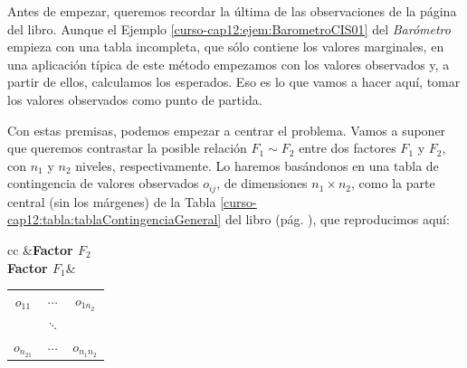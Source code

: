 \documentclass[10pt,a4paper]{article}\usepackage[]{graphicx}\usepackage[]{color}
\newcounter {cont01}
\begin{document}
Antes de empezar, queremos recordar la última de las observaciones de la página \pageref{curso-cap12:lugar:observacionesEjemploBarometro} del libro. Aunque el Ejemplo \ref{curso-cap12:ejem:BarometroCIS01} del {\em Barómetro} empieza con una tabla incompleta, que sólo contiene los valores marginales, en una aplicación típica de este método empezamos con los valores observados y, a partir de ellos, calculamos los esperados.  Eso es lo que vamos a hacer aquí, tomar los valores observados como punto de partida.


Con estas premisas, podemos empezar a centrar el problema. Vamos a suponer que queremos contrastar la posible relación $F_1 \sim F_2$ entre dos factores $F_1$ y $F_2$, con $n_1$ y $n_2$ niveles, respectivamente. Lo haremos basándonos en una tabla de contingencia de valores observados $o_{ij}$, de dimensiones $n_1\times n_2$, como la parte central (sin los márgenes) de la Tabla \ref{curso-cap12:tabla:tablaContingenciaGeneral} del libro (pág. \pageref{curso-cap12:tabla:tablaContingenciaGeneral}), que reproducimos aquí:
    \begin{center}
    \begin{tabular}{cc}
    &{\bf Factor $F_2$}\\
    {\bf Factor $F_1$}&
        \begin{tabular}{|ccc|}
        \hline
        $o_{11}$&$\cdots$&$o_{1n_2}$\\
        &$\ddots$&\\
        $o_{n_21}$&$\cdots$&$o_{n_1n_2}$\\
        \hline
        \end{tabular}
    \end{tabular}
    \end{center}

\end{document}
